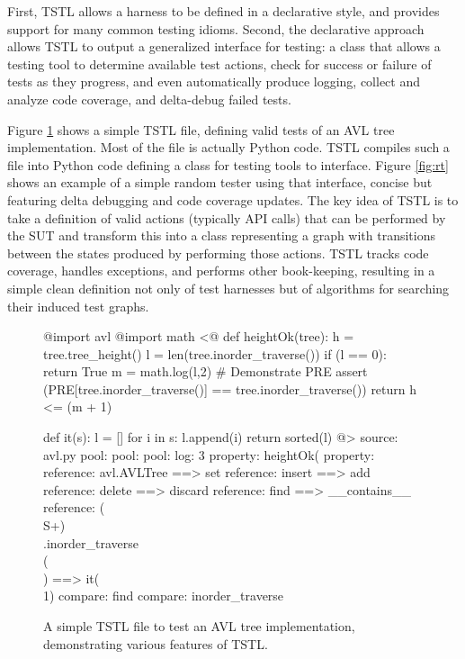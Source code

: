 \documentclass{sig-alternate}
\begin{document}
First, TSTL allows a harness to be defined in a declarative style,
and provides support for many common testing idioms.  Second, the
declarative approach allows TSTL to output a generalized interface for
testing:  a class that allows a testing tool to determine available
test actions, check for success or failure of tests as they progress,
and even automatically produce logging, collect and analyze code
coverage, and delta-debug failed tests.

Figure \ref{fig:avl} shows a simple TSTL file, defining valid tests of
an AVL tree implementation.  Most of the file is actually Python code.
TSTL compiles such a file into Python code defining a class for
testing tools to interface.  Figure \ref{fig:rt} shows an example of a
simple random tester using that interface, concise but featuring delta
debugging \cite{DD} and code coverage updates.  The key idea of TSTL is to
take a definition of valid actions (typically API calls) that can
be performed by the SUT and transform this into a class representing a
graph with transitions between the states produced by performing those
actions.  TSTL tracks code coverage, handles exceptions, and performs
other book-keeping, resulting in a simple clean definition not only of
test harnesses but of algorithms for searching their induced test graphs.

\begin{figure}
\begin{code}
@import avl
@import math
\vspace{0.1in}
<@
def heightOk(tree):
     h = tree.tree\_height()
     l = len(tree.inorder\_traverse())
     if (l == 0):
        return True
     m = math.log(l,2)
     \# Demonstrate PRE
     assert (PRE[tree.inorder\_traverse()] 
             == tree.inorder\_traverse())
     return h <= (m + 1)

 def it(s):
     l = []
     for i in s:
        l.append(i)
     return sorted(l)
@>
\vspace{0.1in}
source: avl.py
\vspace{0.1in}
pool: %
pool: %
pool: %
\vspace{0.1in}
log: 3 %
\vspace{0.1in}
property: heightOk(%
property: %
\vspace{0.1in}
~%
~%
~%
~%
\vspace{0.1in}
reference: avl.AVLTree ==> set
reference: insert ==> add
reference: delete ==> discard
reference: find ==> \_\_contains\_\_
reference: (\\S+)\\.inorder\_traverse\\(\\) ==> it(\\1)
\vspace{0.1in}
compare: find
compare: inorder\_traverse
\end{code}
\caption{A simple TSTL file to test an AVL tree implementation,
  demonstrating various features of TSTL.}
\label{fig:avl}
\end{figure}
\end{document}
